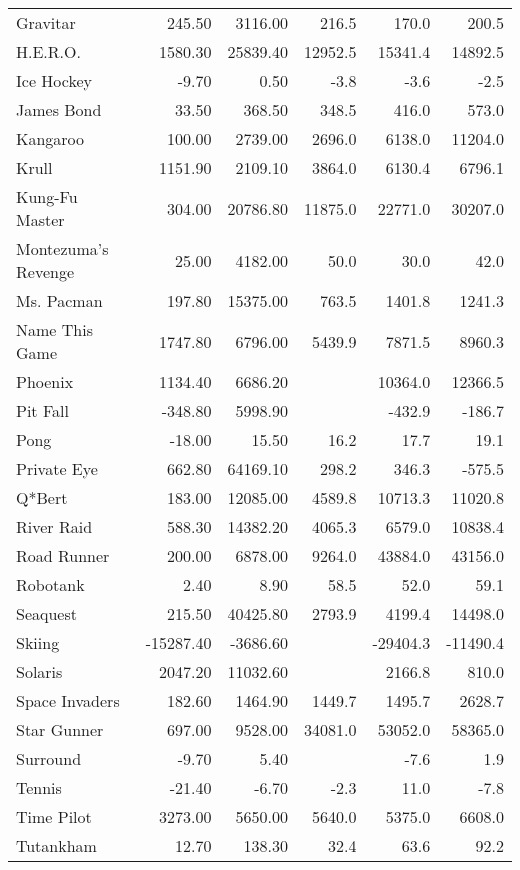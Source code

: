 \documentclass[letterpaper]{article}
\begin{document}
\begin{table*}[h]
\begin{tabular}{lrrrrr}
Gravitar & 245.50 & 3116.00 & 216.5 & 170.0 & 200.5 \\
H.E.R.O. & 1580.30 & 25839.40 & 12952.5 & 15341.4 & 14892.5 \\
Ice Hockey & -9.70 & 0.50 & -3.8 & -3.6 & -2.5 \\
James Bond & 33.50 & 368.50 & 348.5 & 416.0 & 573.0 \\
Kangaroo & 100.00 & 2739.00 & 2696.0 & 6138.0 & 11204.0 \\
Krull & 1151.90 & 2109.10 & 3864.0 & 6130.4 & 6796.1 \\
Kung-Fu Master & 304.00 & 20786.80 & 11875.0 & 22771.0 & 30207.0 \\
Montezuma's Revenge & 25.00 & 4182.00 & 50.0 & 30.0 & 42.0 \\
Ms. Pacman & 197.80 & 15375.00 & 763.5 & 1401.8 & 1241.3 \\
Name This Game & 1747.80 & 6796.00 & 5439.9 & 7871.5 & 8960.3 \\
Phoenix & 1134.40 & 6686.20 &  & 10364.0 & 12366.5 \\
Pit Fall & -348.80 & 5998.90 &  & -432.9 & -186.7 \\
Pong & -18.00 & 15.50 & 16.2 & 17.7 & 19.1 \\
Private Eye & 662.80 & 64169.10 & 298.2 & 346.3 & -575.5 \\
Q*Bert & 183.00 & 12085.00 & 4589.8 & 10713.3 & 11020.8 \\
River Raid & 588.30 & 14382.20 & 4065.3 & 6579.0 & 10838.4 \\
Road Runner & 200.00 & 6878.00 & 9264.0 & 43884.0 & 43156.0 \\
Robotank & 2.40 & 8.90 & 58.5 & 52.0 & 59.1 \\
Seaquest & 215.50 & 40425.80 & 2793.9 & 4199.4 & 14498.0 \\
Skiing & -15287.40 & -3686.60 &  & -29404.3 & -11490.4 \\
Solaris & 2047.20 & 11032.60 &  & 2166.8 & 810.0 \\
Space Invaders & 182.60 & 1464.90 & 1449.7 & 1495.7 & 2628.7 \\
Star Gunner & 697.00 & 9528.00 & 34081.0 & 53052.0 & 58365.0 \\
Surround & -9.70 & 5.40 &  & -7.6 & 1.9 \\
Tennis & -21.40 & -6.70 & -2.3 & 11.0 & -7.8 \\
Time Pilot & 3273.00 & 5650.00 & 5640.0 & 5375.0 & 6608.0 \\
Tutankham & 12.70 & 138.30 & 32.4 & 63.6 & 92.2 \\

\end{tabular}
\end{table*}
\end{document}
